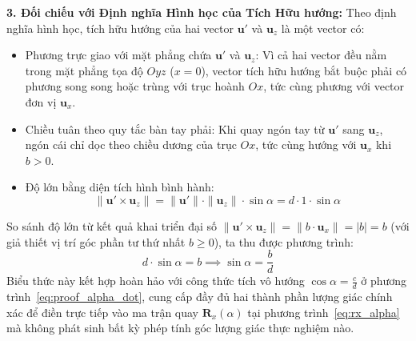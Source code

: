 \textbf{3. Đối chiếu với Định nghĩa Hình học của Tích Hữu hướng:}
Theo định nghĩa hình học, tích hữu hướng của hai vector $\mathbf{u}'$ và $\mathbf{u}_z$ là một vector có:
\begin{itemize}
    \item Phương trực giao với mặt phẳng chứa $\mathbf{u}'$ và $\mathbf{u}_z$: Vì cả hai vector đều nằm trong mặt phẳng tọa độ $Oyz$ ($x = 0$), vector tích hữu hướng bắt buộc phải có phương song song hoặc trùng với trục hoành $Ox$, tức cùng phương với vector đơn vị $\mathbf{u}_x$.
    \item Chiều tuân theo quy tắc bàn tay phải: Khi quay ngón tay từ $\mathbf{u}'$ sang $\mathbf{u}_z$, ngón cái chỉ dọc theo chiều dương của trục $Ox$, tức cùng hướng với $\mathbf{u}_x$ khi $b > 0$.
    \item Độ lớn bằng diện tích hình bình hành:
    \begin{equation}
    \|\mathbf{u}' \times \mathbf{u}_z\| = \|\mathbf{u}'\| \cdot \|\mathbf{u}_z\| \cdot \sin\alpha = d \cdot 1 \cdot \sin\alpha
    \end{equation}
\end{itemize}
So sánh độ lớn từ kết quả khai triển đại số $\|\mathbf{u}' \times \mathbf{u}_z\| = \|b \cdot \mathbf{u}_x\| = |b| = b$ (với giả thiết vị trí góc phần tư thứ nhất $b \ge 0$), ta thu được phương trình:
\begin{equation}
d \cdot \sin\alpha = b \implies \sin\alpha = \frac{b}{d}
\end{equation}
Biểu thức này kết hợp hoàn hảo với công thức tích vô hướng $\cos\alpha = \frac{c}{d}$ ở phương trình~\eqref{eq:proof_alpha_dot}, cung cấp đầy đủ hai thành phần lượng giác chính xác để điền trực tiếp vào ma trận quay $\mathbf{R}_x(\alpha)$ tại phương trình~\eqref{eq:rx_alpha} mà không phát sinh bất kỳ phép tính góc lượng giác thực nghiệm nào.
